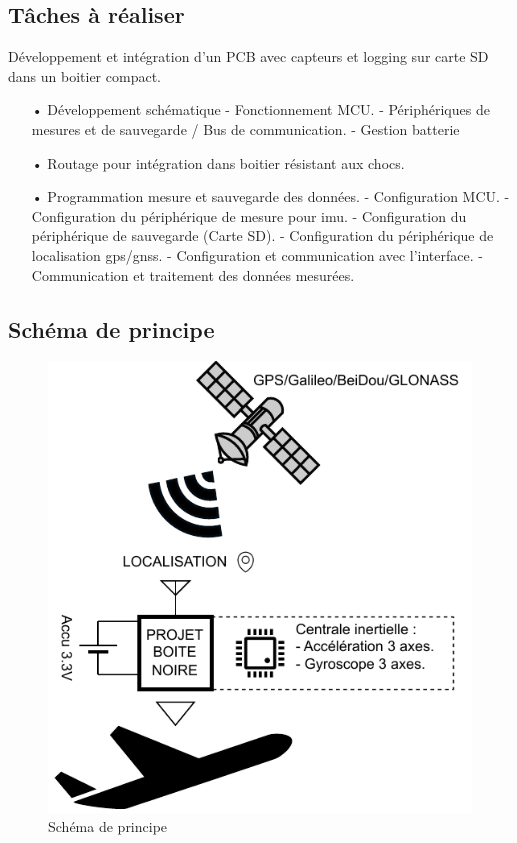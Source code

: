 \subsection{Tâches à réaliser}
Développement et intégration d’un PCB avec capteurs et logging sur carte SD dans un boitier compact.
\begin{itemize}
	\item[•] Développement schématique 
	\subitem- Fonctionnement MCU.
	\subitem-	Périphériques de mesures et de sauvegarde / Bus de communication.
	\subitem-	Gestion batterie 
	\item[•]	Routage pour intégration dans boitier résistant aux chocs.
	\item[•]	Programmation mesure et sauvegarde des données.
	\subitem-	Configuration MCU.
	\subitem-	Configuration du périphérique de mesure pour \gls{imu}.
	\subitem-	Configuration du périphérique de sauvegarde (Carte SD).
	\subitem-	Configuration du périphérique de localisation \gls{gps}/\gls{gnss}.
	\subitem-	Configuration et communication avec l'interface.
	\subitem-	Communication et traitement des données mesurées.
\end{itemize}

\subsection{Schéma de principe}
\begin{figure}[h]
	\centering
	\includegraphics[width=0.6\linewidth]{../figures/cdc/schema_principe}
	\caption{Schéma de principe}
	\label{fig:schemaprincipe}
\end{figure}

